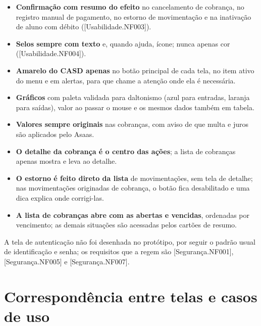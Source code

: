 \documentclass[11pt,a4paper,oneside]{report}
\begin{document}
\begin{itemize}
  \item \textbf{Confirmação com resumo do efeito} no cancelamento de cobrança, no registro manual
        de pagamento, no estorno de movimentação e na inativação de aluno com débito
        ([Usabilidade.NF003]).
  \item \textbf{Selos sempre com texto} e, quando ajuda, ícone; nunca apenas cor
        ([Usabilidade.NF004]).
  \item \textbf{Amarelo do CASD apenas} no botão principal de cada tela, no item ativo do menu e em
        alertas, para que chame a atenção onde ela é necessária.
  \item \textbf{Gráficos} com paleta validada para daltonismo (azul para entradas, laranja para
        saídas), valor ao passar o mouse e os mesmos dados também em tabela.
  \item \textbf{Valores sempre originais} nas cobranças, com aviso de que multa e juros são
        aplicados pelo Asaas.
  \item \textbf{O detalhe da cobrança é o centro das ações}; a lista de cobranças apenas mostra e
        leva ao detalhe.
  \item \textbf{O estorno é feito direto da lista} de movimentações, sem tela de detalhe; nas
        movimentações originadas de cobrança, o botão fica desabilitado e uma dica explica onde
        corrigi-las.
  \item \textbf{A lista de cobranças abre com as abertas e vencidas}, ordenadas por vencimento; as
        demais situações são acessadas pelos cartões de resumo.
\end{itemize}

A tela de autenticação não foi desenhada no protótipo, por seguir o padrão usual de identificação
e senha; os requisitos que a regem são [Segurança.NF001], [Segurança.NF005] e [Segurança.NF007].

\section{Correspondência entre telas e casos de uso}
\end{document}

